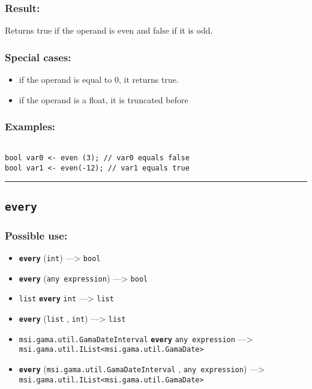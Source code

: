 \documentclass[]{book}
\providecommand{\tightlist}{%
  \setlength{\itemsep}{0pt}\setlength{\parskip}{0pt}}
\theoremstyle{definition}
\theoremstyle{definition}
\theoremstyle{definition}
\theoremstyle{remark}
\begin{document}
\subsubsection{Result:}\label{result-151}

Returns true if the operand is even and false if it is odd.

\subsubsection{Special cases:}\label{special-cases-56}

\begin{itemize}
\tightlist
\item
  if the operand is equal to 0, it returns true.\\
\item
  if the operand is a float, it is truncated before
\end{itemize}

\subsubsection{Examples:}\label{examples-116}

\begin{verbatim}
 
bool var0 <- even (3); // var0 equals false 
bool var1 <- even(-12); // var1 equals true
\end{verbatim}

\begin{center}\rule{0.5\linewidth}{\linethickness}\end{center}

\subsection{\texorpdfstring{\texttt{every}}{every}}\label{every}

\subsubsection{Possible use:}\label{possible-use-158}

\begin{itemize}
\tightlist
\item
  \textbf{\texttt{every}} (\texttt{int}) ---\textgreater{} \texttt{bool}
\item
  \textbf{\texttt{every}} (\texttt{any\ expression}) ---\textgreater{}
  \texttt{bool}
\item
  \texttt{list} \textbf{\texttt{every}} \texttt{int} ---\textgreater{}
  \texttt{list}
\item
  \textbf{\texttt{every}} (\texttt{list} , \texttt{int})
  ---\textgreater{} \texttt{list}
\item
  \texttt{msi.gama.util.GamaDateInterval} \textbf{\texttt{every}}
  \texttt{any\ expression} ---\textgreater{}
  \texttt{msi.gama.util.IList\textless{}msi.gama.util.GamaDate\textgreater{}}
\item
  \textbf{\texttt{every}} (\texttt{msi.gama.util.GamaDateInterval} ,
  \texttt{any\ expression}) ---\textgreater{}
  \texttt{msi.gama.util.IList\textless{}msi.gama.util.GamaDate\textgreater{}}
\end{itemize}
\end{document}
